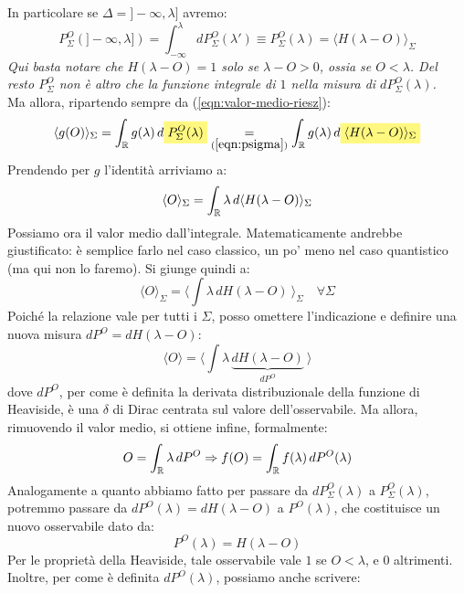\documentclass[FisicaTeorica.tex]{subfiles}
\begin{document}
In particolare se $\Delta= ]-\infty, \lambda]$ avremo:
\begin{equation}
P_\Sigma^O(]-\infty,\lambda]) = \int_{-\infty}^\lambda dP_\Sigma^O(\lambda') \equiv P_\Sigma^O(\lambda) = \langle H(\lambda-O)\rangle_\Sigma
\label{eqn:psigma}
\end{equation}
\textit{Qui basta notare che $H(\lambda-O) = 1$ solo se $\lambda-O>0$, ossia se $O < \lambda$. Del resto $P_\Sigma^O$ non è altro che la funzione integrale di $1$ nella misura di $dP_\Sigma^O(\lambda)$.}\\
Ma allora, ripartendo sempre da (\ref{eqn:valor-medio-riesz}):
\[
\langle g(O) \rangle_\Sigma = \int_\bb{R} g(\lambda)\, d\hlc{Yellow}{P_\Sigma^O(\lambda)} \underset{(\ref{eqn:psigma})}{=} \int_\bb{R} g(\lambda)\, d\hlc{Yellow}{\langle H(\lambda-O)\rangle_\Sigma}
\]
Prendendo per $g$ l'identità arriviamo a:
\begin{equation}
\langle O \rangle_\Sigma = \int_{\mathbb{R}} \lambda\, d\langle H(\lambda-O)\rangle_\Sigma
\label{eqn:Omedio}
\end{equation}
Possiamo ora  il valor medio dall'integrale. Matematicamente andrebbe giustificato: è semplice farlo nel caso classico, un po' meno nel caso quantistico (ma qui non lo faremo). Si giunge quindi a:
\[
\langle O \rangle_\Sigma = \langle \int \lambda\, dH(\lambda-O) \> \rangle_\Sigma\quad \forall \Sigma
\]
Poiché la relazione vale per tutti i $\Sigma$, posso omettere l'indicazione e definire una nuova misura $dP^O = dH(\lambda-O)$:
\[
\langle O \rangle = \langle \int \lambda \, \underbrace{dH(\lambda-O)}_{dP^O} \> \rangle
\]
dove $dP^O$, per come è definita la derivata distribuzionale della funzione di Heaviside, è una $\delta$ di Dirac centrata sul valore dell'osservabile. Ma allora, rimuovendo il valor medio, si ottiene infine, formalmente:
\begin{equation}
O = \int_{\mathbb{R}} \lambda\, dP^O \Rightarrow f(O) = \int_{\mathbb{R}} f(\lambda)\, dP^O(\lambda)
\label{eqn:osservabileformale}
\end{equation}
Analogamente a quanto abbiamo fatto per passare da $dP_\Sigma^O(\lambda)$ a $P_\Sigma^O(\lambda)$, potremmo passare da $dP^O(\lambda) = dH(\lambda-O)$ a $P^O(\lambda)$, che costituisce un nuovo osservabile dato da:
\begin{equation}
P^O(\lambda) = H(\lambda-O)
\label{eqn:POdef}
\end{equation}
Per le proprietà della Heaviside, tale osservabile vale $1$ se $O < \lambda$, e $0$ altrimenti.
Inoltre, per come è definita $dP^O(\lambda)$, possiamo anche scrivere:
\end{document}
